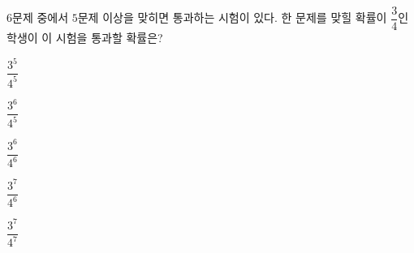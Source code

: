 $6$문제 중에서 $5$문제 이상을 맞히면 통과하는 시험이 있다. 한 문제를 맞힐 확률이 $\dfrac{3}{4}$인 학생이 이 시험을 통과할 확률은? 
\begin{choicesii}{\rule[-3ex]{0pt}{8ex}$\dfrac{3^5}{4^5}$}{\rule[-3ex]{0pt}{8ex}$\dfrac{3^6}{4^5}$}{\rule[-3ex]{0pt}{8ex}$\dfrac{3^6}{4^6}$}{\rule[-3ex]{0pt}{8ex}$\dfrac{3^7}{4^6}$}{\rule[-3ex]{0pt}{8ex}$\dfrac{3^7}{4^7}$}\end{choicesii}
